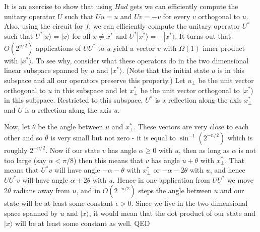 It is an exercise to show that using \(Had\) gets we can efficiently
compute the unitary operator \(U\) such that \(Uu = u\) and \(Uv = -v\)
for every \(v\) orthogonal to \(u\). Also, using the circuit for \(f\),
we can efficiently compute the unitary operator \(U^*\) such that
\(U^*|x\rangle=|x\rangle\) for all \(x\neq x^*\) and
\(U^*|x^*\rangle=-|x^*\rangle\). It turns out that \(O(2^{n/2})\)
applications of \(\ensuremath{\mathit{UU}}^*\) to \(u\) yield a vector
\(v\) with \(\Omega(1)\) inner product with \(|x^*\rangle\). To see why,
consider what these operators do in the two dimensional linear subspace
spanned by \(u\) and \(|x^*\rangle\). (Note that the initial state \(u\)
is in this subspace and all our operators preserve this property.) Let
\(u_\perp\) be the unit vector orthogonal to \(u\) in this subspace and
let \(x^*_\perp\) be the unit vector orthogonal to \(|x^*\rangle\) in
this subspace. Restricted to this subspace, \(U^*\) is a reflection
along the axis \(x^*_\perp\) and \(U\) is a reflection along the axis
\(u\).

Now, let \(\theta\) be the angle between \(u\) and \(x^*_\perp\). These
vectors are very close to each other and so \(\theta\) is very small but
not zero - it is equal to \(\sin^{-1}( 2^{-n/2})\) which is roughly
\(2^{-n/2}\). Now if our state \(v\) has angle \(\alpha \geq 0\) with
\(u\), then as long as \(\alpha\) is not too large (say
\(\alpha<\pi/8\)) then this means that \(v\) has angle \(u+\theta\) with
\(x^*_\perp\). That means that \(U^*v\) will have angle
\(-\alpha-\theta\) with \(x^*_\perp\) or \(-\alpha-2\theta\) with \(u\),
and hence \(\ensuremath{\mathit{UU}}^*v\) will have angle
\(\alpha+2\theta\) with \(u\). Hence in one application from
\(\ensuremath{\mathit{UU}}^*\) we move \(2\theta\) radians away from
\(u\), and in \(O(2^{-n/2})\) steps the angle between \(u\) and our
state will be at least some constant \(\epsilon>0\). Since we live in
the two dimensional space spanned by \(u\) and \(|x\rangle\), it would
mean that the dot product of our state and \(|x\rangle\) will be at
least some constant as well. QED
